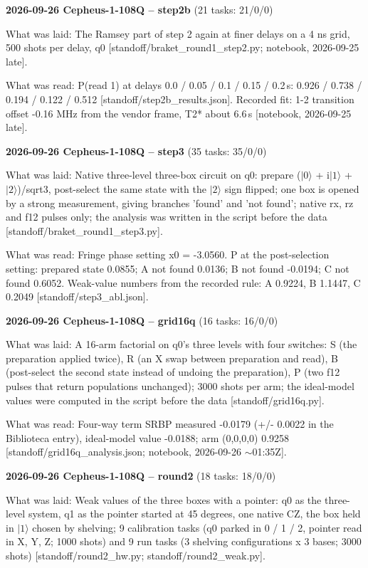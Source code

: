 \documentclass[11pt]{article}
\begin{document}
\textbf{2026-09-26 Cepheus-1-108Q -- step2b} (21 tasks: 21/0/0)

What was laid: The Ramsey part of step 2 again at finer delays on a 4 ns grid, 500 shots per delay, q0 {[}standoff/braket\_round1\_step2.py; notebook, 2026-09-25 late{]}.

What was read: P(read 1) at delays 0.0 / 0.05 / 0.1 / 0.15 / 0.2\,\textmu s: 0.926 / 0.738 / 0.194 / 0.122 / 0.512 {[}standoff/step2b\_results.json{]}. Recorded fit: 1-2 transition offset -0.16 MHz from the vendor frame, T2* about 6.6\,\textmu s {[}notebook, 2026-09-25 late{]}.

\textbf{2026-09-26 Cepheus-1-108Q -- step3} (35 tasks: 35/0/0)

What was laid: Native three-level three-box circuit on q0: prepare (\(|0\rangle\) + i\(|1\rangle\) + \(|2\rangle\))/sqrt3, post-select the same state with the \(|2\rangle\) sign flipped; one box is opened by a strong measurement, giving branches 'found' and 'not found'; native rx, rz and f12 pulses only; the analysis was written in the script before the data {[}standoff/braket\_round1\_step3.py{]}.

What was read: Fringe phase setting x0 = -3.0560. P at the post-selection setting: prepared state 0.0855; A not found 0.0136; B not found -0.0194; C not found 0.6052. Weak-value numbers from the recorded rule: A 0.9224, B 1.1447, C 0.2049 {[}standoff/step3\_abl.json{]}.

\textbf{2026-09-26 Cepheus-1-108Q -- grid16q} (16 tasks: 16/0/0)

What was laid: A 16-arm factorial on q0's three levels with four switches: S (the preparation applied twice), R (an X swap between preparation and read), B (post-select the second state instead of undoing the preparation), P (two f12 pulses that return populations unchanged); 3000 shots per arm; the ideal-model values were computed in the script before the data {[}standoff/grid16q.py{]}.

What was read: Four-way term SRBP measured -0.0179 (+/- 0.0022 in the Biblioteca entry), ideal-model value -0.0188; arm (0,0,0,0) 0.9258 {[}standoff/grid16q\_analysis.json; notebook, 2026-09-26 \(\sim\)01:35Z{]}.

\textbf{2026-09-26 Cepheus-1-108Q -- round2} (18 tasks: 18/0/0)

What was laid: Weak values of the three boxes with a pointer: q0 as the three-level system, q1 as the pointer started at 45 degrees, one native CZ, the box held in \(|1\rangle\) chosen by shelving; 9 calibration tasks (q0 parked in 0 / 1 / 2, pointer read in X, Y, Z; 1000 shots) and 9 run tasks (3 shelving configurations x 3 bases; 3000 shots) {[}standoff/round2\_hw.py; standoff/round2\_weak.py{]}.
\end{document}
